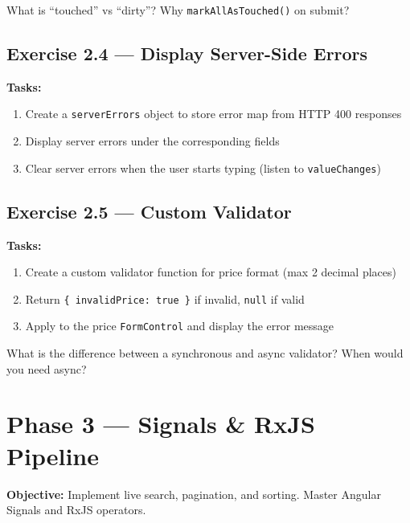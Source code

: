 \documentclass[12pt,a4paper]{report}
\begin{document}
\begin{thinkbox}
What is ``touched'' vs ``dirty''? Why \texttt{markAllAsTouched()} on submit?
\end{thinkbox}

\section{Exercise 2.4 --- Display Server-Side Errors}

\textbf{Tasks:}
\begin{enumerate}
    \item Create a \texttt{serverErrors} object to store error map from HTTP 400 responses
    \item Display server errors under the corresponding fields
    \item Clear server errors when the user starts typing (listen to \texttt{valueChanges})
\end{enumerate}

\section{Exercise 2.5 --- Custom Validator}

\textbf{Tasks:}
\begin{enumerate}
    \item Create a custom validator function for price format (max 2 decimal places)
    \item Return \texttt{\{ invalidPrice: true \}} if invalid, \texttt{null} if valid
    \item Apply to the price \texttt{FormControl} and display the error message
\end{enumerate}

\begin{thinkbox}
What is the difference between a synchronous and async validator? When would you need async?
\end{thinkbox}

\chapter{Phase 3 --- Signals \& RxJS Pipeline}

\textbf{Objective:} Implement live search, pagination, and sorting. Master Angular Signals and RxJS operators.
\end{document}
